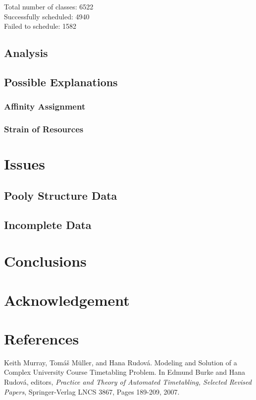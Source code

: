 \documentclass{acm_proc_article-sp}
\begin{document}
		Total number of classes: 6522 \\
		Successfully scheduled: 4940 \\
		Failed to schedule: 1582 \\

	\subsection{Analysis}

	\subsection{Possible Explanations}

		\subsubsection{Affinity Assignment}

		\subsubsection{Strain of Resources}

\section{Issues}

	\subsection{Pooly Structure Data}
	
	\subsection{Incomplete Data}

\section{Conclusions}

\section{Acknowledgement}

\section{References}
\begin{thebibliography}{9}
		Keith Murray, Tomáš Müller, and Hana Rudová.
		Modeling and Solution of a Complex University Course Timetabling Problem.
		In Edmund Burke and Hana Rudová, editors,
		\emph{Practice and Theory of Automated Timetabling, Selected Revised Papers},
		Springer-Verlag LNCS 3867,
		Pages 189-209,
		2007.
\end{thebibliography}
\end{document}
